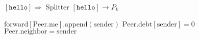 \documentclass{article}
\begin{document}
\pagestyle{empty}

\newcommand{\send}{\Rightarrow}
\newcommand{\sendto}{\rightarrow}
\algrenewcommand{}
\algrenewcommand\textproc{\textrm}

\begin{algorithmic}
  \State $[\mathtt{hello}] \send$ Splitter
  \State $[\mathtt{hello}]\sendto P_k$
  \EndFor
  \EndFunction
\end{algorithmic}
\begin{algorithmic}
  \State $\mathrm{forward}[\mathrm{Peer.me}].\mathrm{append}(\mathrm{sender})$
  \State $\mathrm{Peer}.\mathrm{debt}[\mathrm{sender}] = 0$
  \State $\mathrm{Peer.neighbor} = \mathrm{sender}$
  \EndFunction  
\end{algorithmic}
\end{document}
